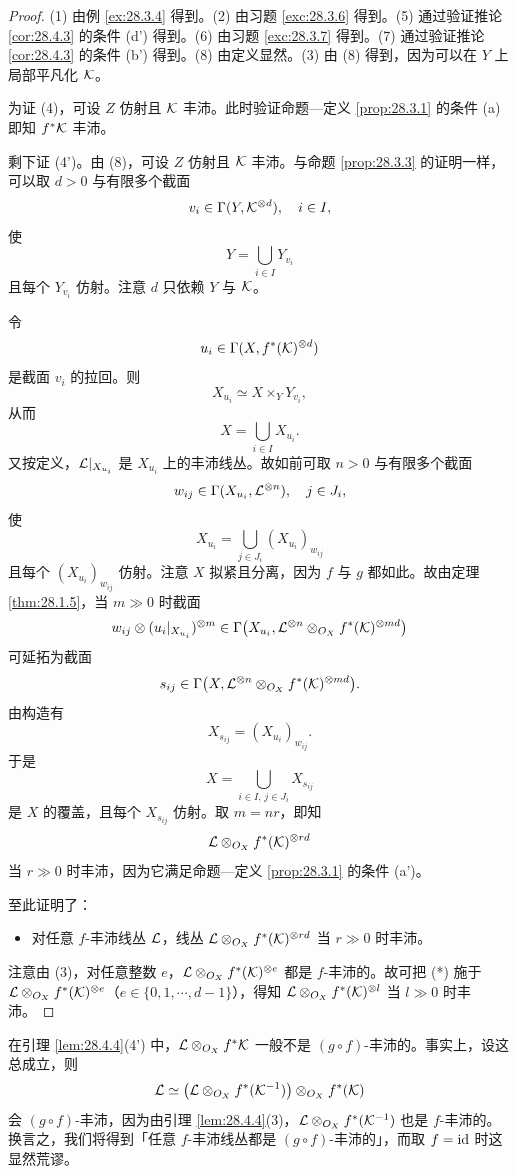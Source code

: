 \begin{proof}
(1) 由例 \ref{ex:28.3.4} 得到。(2) 由习题 \ref{exc:28.3.6} 得到。(5) 通过验证推论 \ref{cor:28.4.3} 的条件 (d') 得到。(6) 由习题 \ref{exc:28.3.7} 得到。(7) 通过验证推论 \ref{cor:28.4.3} 的条件 (b') 得到。(8) 由定义显然。(3) 由 (8) 得到，因为可以在 $Y$ 上局部平凡化 $\mathcal{K}$。

为证 (4)，可设 $Z$ 仿射且 $\mathcal{K}$ 丰沛。此时验证命题—定义 \ref{prop:28.3.1} 的条件 (a) 即知 $f^*\mathcal{K}$ 丰沛。

剩下证 (4')。由 (8)，可设 $Z$ 仿射且 $\mathcal{K}$ 丰沛。与命题 \ref{prop:28.3.3} 的证明一样，可以取 $d>0$ 与有限多个截面
\[
v_i\in\Gamma(Y,\mathcal{K}^{\otimes d}),\quad i\in I,
\]
使
\[
Y=\bigcup_{i\in I}Y_{v_i}
\]
且每个 $Y_{v_i}$ 仿射。注意 $d$ 只依赖 $Y$ 与 $\mathcal{K}$。

令
\[
u_i\in\Gamma(X,f^*(\mathcal{K})^{\otimes d})
\]
是截面 $v_i$ 的拉回。则
\[
X_{u_i}\simeq X\times_Y Y_{v_i},
\]
从而
\[
X=\bigcup_{i\in I}X_{u_i}.
\]
又按定义，$\mathcal{L}|_{X_{u_i}}$ 是 $X_{u_i}$ 上的丰沛线丛。故如前可取 $n>0$ 与有限多个截面
\[
w_{ij}\in\Gamma(X_{u_i},\mathcal{L}^{\otimes n}),\quad j\in J_i,
\]
使
\[
X_{u_i}=\bigcup_{j\in J_i}(X_{u_i})_{w_{ij}}
\]
且每个 $(X_{u_i})_{w_{ij}}$ 仿射。注意 $X$ 拟紧且分离，因为 $f$ 与 $g$ 都如此。故由定理 \ref{thm:28.1.5}，当 $m\gg 0$ 时截面
\[
w_{ij}\otimes (u_i|_{X_{u_i}})^{\otimes m}\in\Gamma\bigl(X_{u_i},\mathcal{L}^{\otimes n}\otimes_{O_X}f^*(\mathcal{K})^{\otimes md}\bigr)
\]
可延拓为截面
\[
s_{ij}\in\Gamma\bigl(X,\mathcal{L}^{\otimes n}\otimes_{O_X}f^*(\mathcal{K})^{\otimes md}\bigr).
\]
由构造有
\[
X_{s_{ij}}=(X_{u_i})_{w_{ij}}.
\]
于是
\[
X=\bigcup_{i\in I,\,j\in J_i}X_{s_{ij}}
\]
是 $X$ 的覆盖，且每个 $X_{s_{ij}}$ 仿射。取 $m=nr$，即知
\[
\mathcal{L}\otimes_{O_X}f^*(\mathcal{K})^{\otimes rd}
\]
当 $r\gg 0$ 时丰沛，因为它满足命题—定义 \ref{prop:28.3.1} 的条件 (a')。

至此证明了：
\begin{itemize}[leftmargin=1.6em,itemsep=0.2ex]
  \item[(*)] 对任意 $f$-丰沛线丛 $\mathcal{L}$，线丛 $\mathcal{L}\otimes_{O_X}f^*(\mathcal{K})^{\otimes rd}$ 当 $r\gg 0$ 时丰沛。
\end{itemize}
注意由 (3)，对任意整数 $e$，$\mathcal{L}\otimes_{O_X}f^*(\mathcal{K})^{\otimes e}$ 都是 $f$-丰沛的。故可把 (*) 施于 $\mathcal{L}\otimes_{O_X}f^*(\mathcal{K})^{\otimes e}$（$e\in\{0,1,\cdots,d-1\}$），得知 $\mathcal{L}\otimes_{O_X}f^*(\mathcal{K})^{\otimes l}$ 当 $l\gg 0$ 时丰沛。
\end{proof}

\begin{warning}\label{warn:28.4.5}
在引理 \ref{lem:28.4.4}(4') 中，$\mathcal{L}\otimes_{O_X}f^*\mathcal{K}$ 一般不是 $(g\circ f)$-丰沛的。事实上，设这总成立，则
\[
\mathcal{L}\simeq\bigl(\mathcal{L}\otimes_{O_X}f^*(\mathcal{K}^{-1})\bigr)\otimes_{O_X}f^*(\mathcal{K})
\]
会 $(g\circ f)$-丰沛，因为由引理 \ref{lem:28.4.4}(3)，$\mathcal{L}\otimes_{O_X}f^*(\mathcal{K}^{-1})$ 也是 $f$-丰沛的。换言之，我们将得到「任意 $f$-丰沛线丛都是 $(g\circ f)$-丰沛的」，而取 $f=\operatorname{id}$ 时这显然荒谬。
\end{warning}

